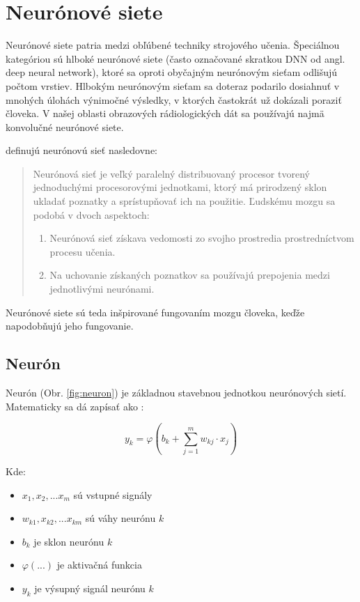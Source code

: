 \section{Neurónové siete}

Neurónové siete patria medzi obľúbené techniky strojového učenia. Špeciálnou kategóriou sú hlboké neurónové siete (často označované skratkou DNN od angl. deep neural network), ktoré sa oproti obyčajným neurónovým sieťam odlišujú počtom vrstiev. Hlbokým neurónovým sieťam sa doteraz podarilo dosiahnuť v mnohých úlohách výnimočné výsledky, v ktorých častokrát už dokázali poraziť človeka. V našej oblasti obrazových rádiologických dát sa používajú najmä konvolučné neurónové siete.

\citeauthor*{haykin2009neural} \cite{haykin2009neural} definujú neurónovú sieť nasledovne: 
\begin{quote}Neurónová sieť je veľký paralelný distribuovaný procesor tvorený jednoduchými procesorovými jednotkami, ktorý má prirodzený sklon ukladať poznatky a sprístupňovať ich na použitie. Ľudskému mozgu sa podobá v dvoch aspektoch: 
    \begin{enumerate}
        \item Neurónová sieť získava vedomosti zo svojho prostredia prostredníctvom procesu učenia.
        \item Na uchovanie získaných poznatkov sa používajú prepojenia medzi jednotlivými neurónami.
    \end{enumerate}
\end{quote}
Neurónové siete sú teda inšpirované fungovaním mozgu človeka, keďže napodobňujú jeho fungovanie.

\subsection{Neurón} 

Neurón (Obr. \ref{fig:neuron}) je základnou stavebnou jednotkou neurónových sietí. Matematicky sa dá zapísať ako \cite{haykin2009neural}:

\begin{equation}
    y_k = \varphi(b_k + \sum_{j=1}^{m} w_{kj}\cdot x_j)
    \label{eq:neuron}
\end{equation}

Kde:
\begin{itemize}
    \item $x_1, x_2, ... x_m$ sú vstupné signály
    \item $w_{k1}, x_{k2}, ... x_{km}$ sú váhy neurónu $k$
    \item $b_k$ je sklon neurónu $k$
    \item $\varphi(...)$ je aktivačná funkcia
    \item $y_k$ je výsupný signál neurónu $k$
\end{itemize}

